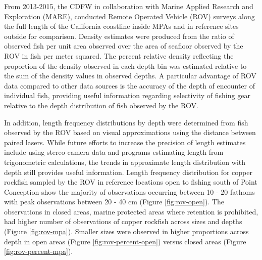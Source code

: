 \documentclass[11pt,
  english,
  a4paper,
]{article}
\begin{document}
\leavevmode\tagmcend\tagstructend


From 2013-2015, the CDFW in collaboration with Marine Applied Research and Exploration (MARE), conducted Remote Operated Vehicle (ROV) surveys along the full length of the California coastline inside MPAs and in reference sites outside for comparison. Density estimates were produced from the ratio of observed fish per unit area observed over the area of seafloor observed by the ROV in fish per meter squared. The percent relative density reflecting the proportion of the density observed in each depth bin was estimated relative to the sum of the density values in observed depths. A particular advantage of ROV data compared to other data sources is the accuracy of the depth of encounter of individual fish, providing useful information regarding selectivity of fishing gear relative to the depth distribution of fish observed by the ROV.

\leavevmode\tagmcend\tagstructend\par


In addition, length frequency distributions by depth were determined from fish observed by the ROV based on visual approximations using the distance between paired lasers. While future efforts to increase the precision of length estimates include using stereo-camera data and programs estimating length from trigonometric calculations, the trends in approximate length distribution with depth still provides useful information. Length frequency distribution for copper rockfish sampled by the ROV in reference locations open to fishing south of Point Conception show the majority of observations occurring between 10 - 20 fathoms with peak observations between 20 - 40 cm (Figure \ref{fig:rov-open}). The observations in closed areas, marine protected areas where retention is prohibited, had higher number of observations of copper rockfish across sizes and depths (Figure \ref{fig:rov-mpa}). Smaller sizes were observed in higher proportions across depth in open areas (Figure \ref{fig:rov-percent-open}) versus closed areas (Figure \ref{fig:rov-percent-mpa}).

\leavevmode\tagmcend\tagstructend\par

\end{document}
